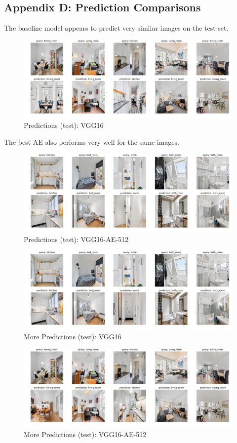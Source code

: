 \subsection*{Appendix D: Prediction Comparisons} \label{appendix: D}
The baseline model appears to predict very similar images on the test-set. 
\begin{figure}[H]
    \centering
      \includegraphics[width=\textwidth]{pictures/plots/vgg16purepred}
      \caption{Predictions (test): VGG16}
      \label{fig:vggpure}
\end{figure}

The best AE also performs very well for the same images.
\begin{figure}[H]
    \centering
      \includegraphics[width=\textwidth]{pictures/plots/test_final_5by2}
      \caption{Predictions (test): VGG16-AE-512}
      \label{fig:vggdae}
\end{figure}

\begin{figure}[H]
  \centering
    \includegraphics[width=\textwidth]{pictures/plots/vgg16purepred_2}
    \caption{More Predictions (test): VGG16}
    \label{fig:vggpure2}
\end{figure}

\begin{figure}[H]
  \centering
    \includegraphics[width=\textwidth]{pictures/plots/test_final_5by2_2}
    \caption{More Predictions (test): VGG16-AE-512}
    \label{fig:vggdae2}
\end{figure}
